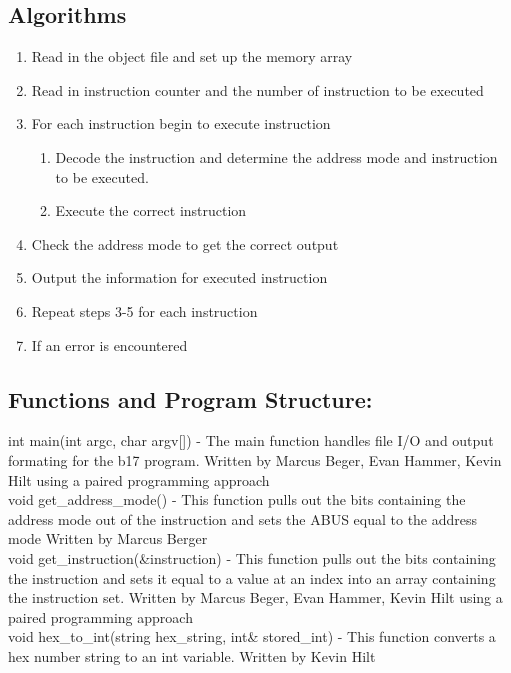 \documentclass[11pt]{article}
\begin{document}
\subsection{Algorithms}
\begin{enumerate}
\item Read in the object file and set up the memory array
\item Read in instruction counter and the number of instruction to be executed
\item For each instruction  begin to execute instruction
\begin{enumerate}\item Decode the instruction and determine the address mode and instruction to be executed.
\item Execute the correct instruction \end{enumerate}
\item Check the address mode to get the correct output
\item Output the information for executed instruction 
\item Repeat steps 3-5 for each instruction
\item If an error is encountered 
\end{enumerate}

\subsection{Functions and Program Structure:}
int main(int argc, char\* argv[]) - The main function handles file I/O and output formating for the b17 program. Written by Marcus Beger, Evan Hammer, Kevin Hilt using a paired programming approach\\

void get\_address\_mode() - This function pulls out the bits containing the address mode out of the  instruction and sets the ABUS equal to the address mode Written by Marcus Berger\\

void get\_instruction(\&instruction) - This function pulls out the bits containing the instruction and sets it equal to a value at an index into an array containing the instruction set. Written by Marcus Beger, Evan Hammer, Kevin Hilt using a paired programming approach\\

void hex\_to\_int(string hex\_string, int\& stored\_int) - This function converts a hex number string to an int variable. Written by Kevin Hilt\\
\end{document}
